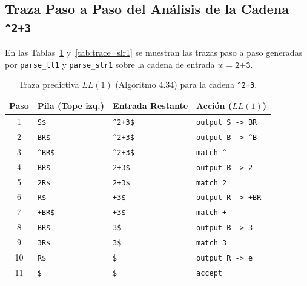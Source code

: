 \documentclass[11pt,a4paper]{article}
\begin{document}
\subsection{Traza Paso a Paso del An\'alisis de la Cadena \texttt{\^{}2+3}}
En las Tablas~\ref{tab:trace_ll1} y~\ref{tab:trace_slr1} se muestran las trazas paso a paso generadas por \texttt{parse\_ll1} y \texttt{parse\_slr1} sobre la cadena de entrada $w = \texttt{\^{}2+3}$.

\begin{table}[htbp]
\centering
\small
\begin{tabular}{@{}c|llp{4.5cm}@{}}
\toprule
\textbf{Paso} & \textbf{Pila (Tope izq.)} & \textbf{Entrada Restante} & \textbf{Acci\'on ($LL(1)$)} \\
\midrule
1 & \texttt{S\$} & \texttt{\^{}2+3\$} & \texttt{output S -> BR} \\
2 & \texttt{BR\$} & \texttt{\^{}2+3\$} & \texttt{output B -> \^{}B} \\
3 & \texttt{\^{}BR\$} & \texttt{\^{}2+3\$} & \texttt{match \^{}} \\
4 & \texttt{BR\$} & \texttt{2+3\$} & \texttt{output B -> 2} \\
5 & \texttt{2R\$} & \texttt{2+3\$} & \texttt{match 2} \\
6 & \texttt{R\$} & \texttt{+3\$} & \texttt{output R -> +BR} \\
7 & \texttt{+BR\$} & \texttt{+3\$} & \texttt{match +} \\
8 & \texttt{BR\$} & \texttt{3\$} & \texttt{output B -> 3} \\
9 & \texttt{3R\$} & \texttt{3\$} & \texttt{match 3} \\
10 & \texttt{R\$} & \texttt{\$} & \texttt{output R -> e} \\
11 & \texttt{\$} & \texttt{\$} & \texttt{accept} \\
\bottomrule
\end{tabular}
\caption{Traza predictiva $LL(1)$ (Algoritmo 4.34) para la cadena \texttt{\^{}2+3}.}
\label{tab:trace_ll1}
\end{table}
\end{document}
